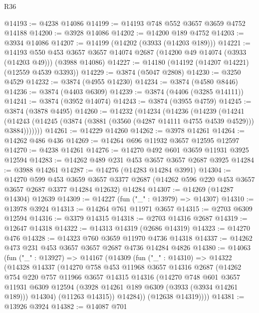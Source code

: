 \begin{lexlean}{R36}
\begin{coremodule}
@14193 := @4238 @14086
@14199 := @14193 @748 @552 @3657 @3659 @4752 @14188
@14200 := @3928 @14086
@14202 := @14200 @189 @4752
@14203 := @3934 @14086
@14207 := @14199 (@14202 (@3933 (@14203 @189)))
@14221 := @14193
    @550
    @453
    @3657
    @3657
    @14074
    @2687
    (@14200 @49 @14074 (@3933 (@14203 @49)))
    (@3988 @14086)
@14227 := @14180 (@14192 (@14207 @14221) (@12559 @4539 @3393))
@14229 := @3874 (@5047 @2808)
@14230 := @3250 @4529
@14232 := @3874 (@4955 @14230)
@14234 := @3874 (@4580 @8446)
@14236 := @3874 (@4403 @6309)
@14239 := @3874 (@4406 (@3285 @14111))
@14241 := @3874 (@3952 @14074)
@14243 := @3874 (@3955 @4759)
@14245 := @3874 (@3878 @4495)
@14260 := @14232
    (@14234
      (@14236
        (@14239
          (@14241
            (@14243 (@14245 (@3874 (@3881 (@3560 (@4287 @14111 @4755 @4539 @4529))) @3884)))))))
@14261 := @14229 @14260
@14262 := @3978 @14261
@14264 := @14262 @486 @436
@14269 := @14264 @696 @11932 @3657 @12595 @12597
@14270 := @4238 @14261
@14276 := @14270 @492 @601 @3659 @11931 @3925 @12594
@14283 := @14262 @489 @231 @453 @3657 @3657 @2687 @3925
@14284 := @3988 @14261
@14287 := @14276 (@14283 @14284 @3991)
@14304 := @14270
    @599
    @453
    @3659
    @3657
    @3377
    @2687
    (@14262 @596 @220 @453 @3657 @3657 @2687 @3377 @14284 @12632)
    @14284
@14307 := @14269 (@14287 @14304) @12639
@14309 := @14227 (fun ("_" : @13979) => @14307)
@14310 := @13978 @3924
@14313 := @14264 @761 @11971 @3657
@14315 := @2703 @6309 @12594
@14316 := @3379 @14315
@14318 := @2703 @14316 @2687
@14319 := @12647 @14318
@14322 := @14313 @14319 (@2686 @14319)
@14323 := @14270 @476
@14328 := @14323 @760 @3659 @11970 @4736 @14318
@14337 := @14262 @473 @231 @453 @3657 @3657 @2687 @4736 @14284 @4826
@14380 := @14063
    (fun ("_" : @13927) =>
    @14167
      (@14309
        (fun ("_" : @14310) =>
        @14322
          (@14328
            @14337
            (@14270
              @758
              @453
              @11968
              @3657
              @14316
              @2687
              (@14262
                @754
                @220
                @757
                @11966
                @3657
                @14315
                @14316
                (@14270
                  @748
                  @601
                  @3657
                  @11931
                  @6309
                  @12594
                  (@3928 @14261 @189 @6309 (@3933 (@3934 @14261 @189)))
                  @14304)
                (@11263 @14315))
              @14284))
          (@12638 @14319))))
@14381 := @13926 @3924
@14382 := @14087 @701

\end{coremodule}
\end{lexlean}
